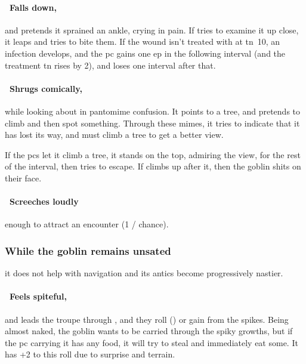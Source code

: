 \documentclass[10pt,twoside]{book}
\begin{document}
\paragraph{\Square~Falls down,}
and pretends it sprained an ankle, crying in pain.
If  tries to examine it up close, it leaps and tries to bite them.
If the wound isn't treated with  at \gls{tn}~10, an infection develops, and the \gls{pc} gains one \gls{ep} in the following \gls{interval} (and the treatment \gls{tn} rises by 2), and loses  one \gls{interval} after that.

\paragraph{\Square~Shrugs comically,}
while looking about in pantomime confusion.
It points to a tree, and pretends to climb and then spot something.
Through these mimes, it tries to indicate that it has lost its way, and must climb a tree to get a better view.

If the \glspl{pc} let it climb a tree, it stands on the top, admiring the view, for the rest of the \gls{interval}, then tries to escape.
If  climbs up after it, then the goblin shits on their face.

\paragraph{\Square~Screeches loudly}
enough to attract an encounter (1 /  chance).

\subsubsection{While the goblin remains unsated}
it does not help with \gls{navigation} and its antics become progressively nastier.

\paragraph{\Square~Feels spiteful,}
and leads the troupe through , and they roll  (\tn[10]) or gain  from the spikes.
Being almost naked, the goblin wants to be carried through the spiky growths, but if the \gls{pc} carrying it has any food, it will try to steal and immediately eat some.
It has +2 to this roll due to surprise and terrain.

\end{document}
